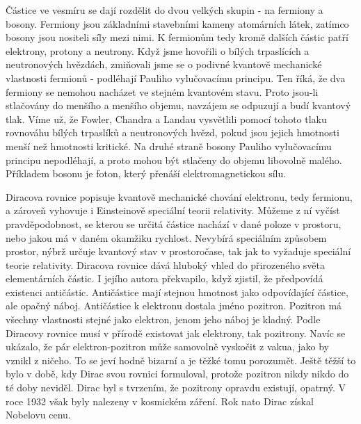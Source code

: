   Částice ve vesmíru se dají rozdělit do dvou velkých skupin - na fermiony a bosony. Fermiony jsou
  základními stavebními kameny atomárních látek, zatímco bosony jsou nositeli síly mezi nimi. K
  fermionům tedy kromě dalších částic patří elektrony, protony a neutrony. Když jsme hovořili o
  bílých trpaslících a neutronových hvězdách, zmiňovali jsme se o podivné kvantově mechanické
  vlastnosti fermionů - podléhají Pauliho vylučovacímu principu. Ten říká, že dva fermiony se
  nemohou nacházet ve stejném kvantovém stavu. Proto jsou-li stlačovány do menšího a menšího objemu,
  navzájem se odpuzují a budí kvantový tlak. Víme už, že Fowler, Chandra a Landau vysvětlili pomocí
  tohoto tlaku rovnováhu bílých trpaslíků a neutronových hvězd, pokud jsou jejich hmotnosti menší
  než hmotnosti kritické. Na druhé straně bosony Pauliho vylučovacímu principu nepodléhají, a proto
  mohou být stlačeny do objemu libovolně malého. Příkladem bosonu je foton, který přenáší
  elektromagnetickou sílu. 
  
  Diracova rovnice popisuje kvantově mechanické chování elektronu, tedy fermionu, a zároveň vyhovuje
  i Einsteinově speciální teorii relativity. Můžeme z ní vyčíst pravděpodobnost, se kterou se určitá
  částice nachází v dané poloze v prostoru, nebo jakou má v daném okamžiku rychlost. Nevybírá
  speciálním způsobem prostor, nýbrž určuje kvantový stav v prostoročase, tak jak to vyžaduje
  speciální teorie relativity. Diracova rovnice dává hluboký vhled do přirozeného světa
  elementárních částic. I jejího autora překvapilo, když zjistil, že předpovídá existenci
  antičástic. Antičástice mají stejnou hmotnost jako odpovídající částice, ale opačný náboj.
  Antičástice k elektronu dostala jméno pozitron. Pozitron má všechny vlastnosti stejné jako
  elektron, jenom jeho náboj je kladný. Podle Diracovy rovnice musí v přírodě existovat jak
  elektrony, tak pozitrony. Navíc se ukázalo, že pár elektron-pozitron může samovolně vyskočit z
  vakua, jako by vznikl z ničeho. To se jeví hodně bizarní a je těžké tomu porozumět. Ještě těžší to
  bylo v době, kdy Dirac svou rovnici formuloval, protože pozitron nikdy nikdo do té doby neviděl.
  Dirac byl s tvrzením, že pozitrony opravdu existují, opatrný. V roce 1932 však byly nalezeny v
  kosmickém záření. Rok nato Dirac získal Nobelovu cenu. 
  
